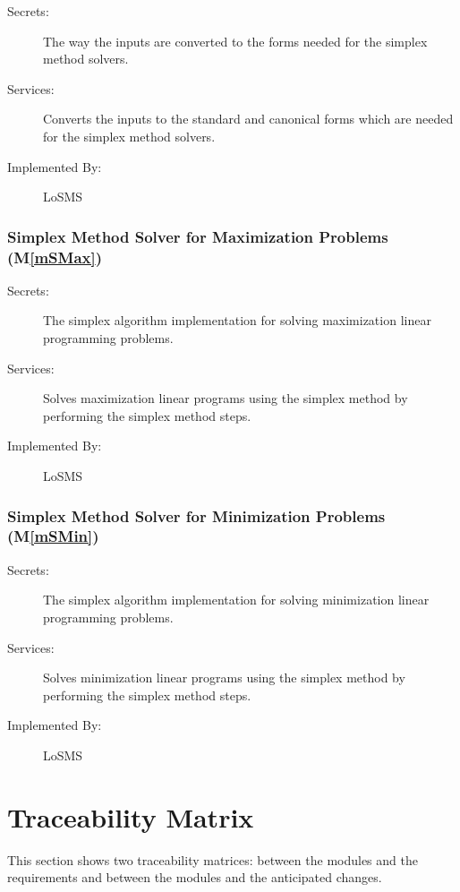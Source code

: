 \documentclass[12pt, titlepage]{article}
\newcommand{\mref}[1]{M\ref{#1}}
\newcommand{\famname}{LoSMS} %
\begin{document}
\begin{description}
	\item[Secrets:]The way the inputs are converted to the forms needed for the 
	simplex method solvers.
	\item[Services:]Converts the inputs to the standard and canonical forms 
	which are needed for the simplex method solvers.
	\item[Implemented By:] \famname{}
\end{description}

\subsubsection{Simplex Method Solver for Maximization Problems (\mref{mSMax})}

\begin{description}
	\item[Secrets:]The simplex algorithm implementation for solving 
	maximization linear programming problems.
	\item[Services:]Solves maximization linear programs using the simplex 
	method by performing the simplex method steps.
	\item[Implemented By:] \famname{}
\end{description}

\subsubsection{Simplex Method Solver for Minimization Problems (\mref{mSMin})}

\begin{description}
	\item[Secrets:]The simplex algorithm implementation for solving 
	minimization linear programming problems.
	\item[Services:]Solves minimization linear programs using the simplex 
	method by performing the simplex method steps.
	\item[Implemented By:] \famname{}
\end{description}

\section{Traceability Matrix} \label{SecTM}

This section shows two traceability matrices: between the modules and the
requirements and between the modules and the anticipated changes.
\end{document}
